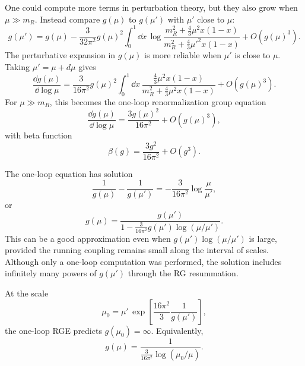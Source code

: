 One could compute more terms in perturbation theory, but they also grow when
\(\mu\gg m_R\).  Instead compare \(g(\mu)\) to \(g(\mu')\) with
\(\mu'\) close to \(\mu\):
\[
  g(\mu')
  =
  g(\mu)
  -\frac{3}{32\pi^2}g(\mu)^2
  \int_0^1\dd x\,
  \log
  \frac{m_R^2+\frac{4}{3}\mu^2x(1-x)}
       {m_R^2+\frac{4}{3}{\mu'}^2x(1-x)}
  +O(g(\mu)^3).
\]
The perturbative expansion in \(g(\mu)\) is more reliable when
\(\mu'\) is close to \(\mu\).  Taking \(\mu'=\mu+d\mu\) gives
\[
  \frac{\dd g(\mu)}{\dd\log\mu}
  =
  \frac{3}{16\pi^2}g(\mu)^2
  \int_0^1\dd x\,
  \frac{\frac{4}{3}\mu^2x(1-x)}
       {m_R^2+\frac{4}{3}\mu^2x(1-x)}
  +O(g(\mu)^3).
\]
For \(\mu\gg m_R\), this becomes the one-loop renormalization group equation
\[
  \frac{\dd g(\mu)}{\dd\log\mu}
  =
  \frac{3g(\mu)^2}{16\pi^2}+O(g(\mu)^3),
\]
with beta function
\[
  \beta(g)=\frac{3g^2}{16\pi^2}+O(g^3).
\]

The one-loop equation has solution
\[
  \frac{1}{g(\mu)}-\frac{1}{g(\mu')}
  =
  -\frac{3}{16\pi^2}\log\frac{\mu}{\mu'},
\]
or
\[
  g(\mu)
  =
  \frac{g(\mu')}
       {1-\frac{3}{16\pi^2}g(\mu')\log(\mu/\mu')}.
\]
This can be a good approximation even when
\(g(\mu')\log(\mu/\mu')\) is large, provided the running coupling remains
small along the interval of scales.  Although only a one-loop computation was
performed, the solution includes infinitely many powers of \(g(\mu')\) through
the RG resummation.

At the scale
\[
  \mu_0
  =
  \mu'\,
  \exp\left[
    \frac{16\pi^2}{3}\frac{1}{g(\mu')}
  \right],
\]
the one-loop RGE predicts \(g(\mu_0)=\infty\).  Equivalently,
\[
  g(\mu)
  =
  \frac{1}
       {\frac{3}{16\pi^2}\log(\mu_0/\mu)}.
\]

\begin{center}
\end{center}

